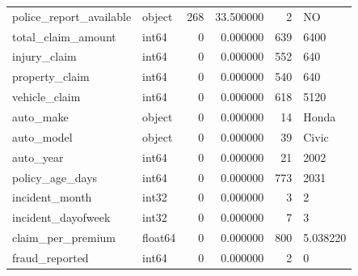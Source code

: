 \begin{tabular}{llrrrl}
police\_report\_available & object & 268 & 33.500000 & 2 & NO \\
total\_claim\_amount & int64 & 0 & 0.000000 & 639 & 6400 \\
injury\_claim & int64 & 0 & 0.000000 & 552 & 640 \\
property\_claim & int64 & 0 & 0.000000 & 540 & 640 \\
vehicle\_claim & int64 & 0 & 0.000000 & 618 & 5120 \\
auto\_make & object & 0 & 0.000000 & 14 & Honda \\
auto\_model & object & 0 & 0.000000 & 39 & Civic \\
auto\_year & int64 & 0 & 0.000000 & 21 & 2002 \\
policy\_age\_days & int64 & 0 & 0.000000 & 773 & 2031 \\
incident\_month & int32 & 0 & 0.000000 & 3 & 2 \\
incident\_dayofweek & int32 & 0 & 0.000000 & 7 & 3 \\
claim\_per\_premium & float64 & 0 & 0.000000 & 800 & 5.038220 \\
fraud\_reported & int64 & 0 & 0.000000 & 2 & 0 \\
\bottomrule
\end{tabular}
